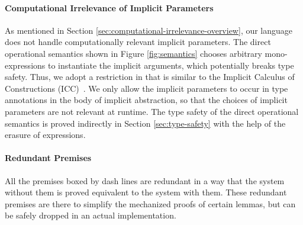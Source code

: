 \paragraph{Computational Irrelevance of Implicit Parameters}

As mentioned in Section \ref{sec:computational-irrelevance-overview}, our language
does not handle computationally relevant implicit parameters.
The direct operational semantics shown in Figure \ref{fig:semantics} chooses
arbitrary mono-expressions to instantiate the implicit arguments,
which potentially breaks type safety.
Thus, we adopt a restriction in  that is similar to the
Implicit Calculus of Constructions (ICC)~\citep{miquel2001implicit}.
We only allow the implicit parameters to occur in type annotations in the
body of implicit abstraction, so that the choices of implicit parameters are not
relevant at runtime. The type safety of the direct operational semantics is
proved indirectly in Section \ref{sec:type-safety} with the help of the
erasure of expressions.

\paragraph{Redundant Premises}

All the premises boxed by dash lines are redundant in a way that
the system without them is proved equivalent to the system with them.
These redundant premises are there to simplify the mechanized proofs of
certain lemmas, but can be safely dropped in an actual implementation.
